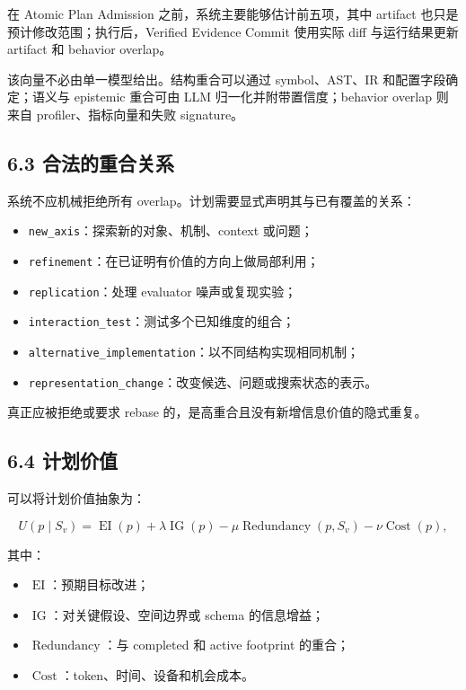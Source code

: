 \documentclass[
  11pt]{ctexart}
\providecommand{\tightlist}{%
  \setlength{\itemsep}{0pt}\setlength{\parskip}{0pt}}
\begin{document}
在 Atomic Plan Admission 之前，系统主要能够估计前五项，其中 artifact
也只是预计修改范围；执行后，Verified Evidence Commit 使用实际 diff
与运行结果更新 artifact 和 behavior overlap。

该向量不必由单一模型给出。结构重合可以通过 symbol、AST、IR
和配置字段确定；语义与 epistemic 重合可由 LLM
归一化并附带置信度；behavior overlap 则来自 profiler、指标向量和失败
signature。

\subsection{6.3
合法的重合关系}\label{ux5408ux6cd5ux7684ux91cdux5408ux5173ux7cfb}

系统不应机械拒绝所有 overlap。计划需要显式声明其与已有覆盖的关系：

\begin{itemize}
\tightlist
\item
  \texttt{new\_axis}：探索新的对象、机制、context 或问题；
\item
  \texttt{refinement}：在已证明有价值的方向上做局部利用；
\item
  \texttt{replication}：处理 evaluator 噪声或复现实验；
\item
  \texttt{interaction\_test}：测试多个已知维度的组合；
\item
  \texttt{alternative\_implementation}：以不同结构实现相同机制；
\item
  \texttt{representation\_change}：改变候选、问题或搜索状态的表示。
\end{itemize}

真正应被拒绝或要求 rebase 的，是高重合且没有新增信息价值的隐式重复。

\subsection{6.4 计划价值}\label{ux8ba1ux5212ux4ef7ux503c}

可以将计划价值抽象为：

\[
U(p\mid S_v)=
\operatorname{EI}(p)
+\lambda\operatorname{IG}(p)
-\mu\operatorname{Redundancy}(p,S_v)
-\nu\operatorname{Cost}(p),
\]

其中：

\begin{itemize}
\tightlist
\item
  \(\operatorname{EI}\)：预期目标改进；
\item
  \(\operatorname{IG}\)：对关键假设、空间边界或 schema 的信息增益；
\item
  \(\operatorname{Redundancy}\)：与 completed 和 active footprint
  的重合；
\item
  \(\operatorname{Cost}\)：token、时间、设备和机会成本。
\end{itemize}
\end{document}
